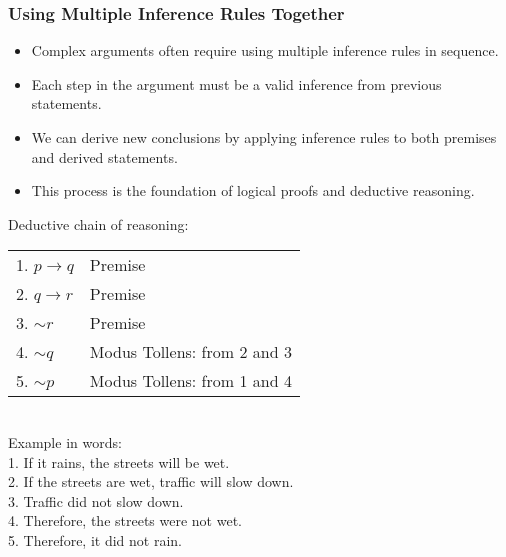 \documentclass{beamer}
\begin{document}
                                \begin{frame}
                                \frametitle{Using Multiple Inference Rules Together}
                                \begin{itemize}
                                    \scriptsize
                                    \item Complex arguments often require using multiple inference rules in sequence.
                                    \item Each step in the argument must be a valid inference from previous statements.
                                    \item We can derive new conclusions by applying inference rules to both premises and derived statements.
                                    \item This process is the foundation of logical proofs and deductive reasoning.
                                \end{itemize}
                                
                                \begin{example}
                                    \scriptsize
                                Deductive chain of reasoning:\\[0.3cm]
                                \begin{tabular}{ll}
                                1. $p \rightarrow q$ & Premise \\
                                2. $q \rightarrow r$ & Premise \\
                                3. $\sim r$ & Premise \\
                                4. $\sim q$ & Modus Tollens: from 2 and 3 \\
                                5. $\sim p$ & Modus Tollens: from 1 and 4 \\
                                \end{tabular}\\[0.3cm]
                                Example in words:\\
                                1. If it rains, the streets will be wet.\\
                                2. If the streets are wet, traffic will slow down.\\
                                3. Traffic did not slow down.\\
                                4. Therefore, the streets were not wet.\\
                                5. Therefore, it did not rain.
                                \end{example}
                                \end{frame}
                                
\end{document}
